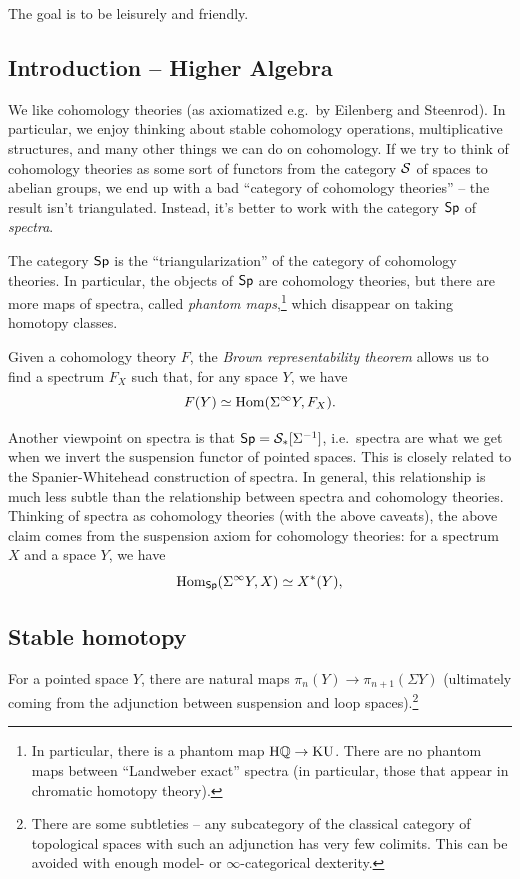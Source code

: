 \documentclass{article}
\begin{document}
The goal is to be leisurely and friendly.

\subsection{Introduction -- Higher Algebra}

We like cohomology theories (as axiomatized e.g.\ by Eilenberg and Steenrod).
In particular, we enjoy thinking about stable cohomology operations, multiplicative structures, and many other things we can do on cohomology.
If we try to think of cohomology theories as some sort of functors from the category $\mathcal{S}$ of spaces to abelian groups, we end up with a bad ``category of cohomology theories'' -- the result isn't triangulated.
Instead, it's better to work with the category $\mathsf{Sp}$ of \emph{spectra}.

\begin{thm}
	The category $\mathsf{Sp}$ is the ``triangularization'' of the category of cohomology theories.
	In particular, the objects of $\mathsf{Sp}$ are cohomology theories, but there are more maps of spectra, called \emph{phantom maps},\footnote{In particular, there is a phantom map $\mathrm{H}\mathbb{Q} \to \mathrm{KU}$.
	There are no phantom maps between ``Landweber exact'' spectra (in particular, those that appear in chromatic homotopy theory).} which disappear on taking homotopy classes.
\end{thm}

Given a cohomology theory $F$, the \emph{Brown representability theorem} allows us to find a spectrum $F_X$ such that, for any space $Y$, we have
\[
	F(Y) \simeq \operatorname{Hom}(\Sigma^\infty Y, F_X).
\]

Another viewpoint on spectra is that $\mathsf{Sp} = \mathcal{S}_*[\Sigma^{-1}]$, i.e.\ spectra are what we get when we invert the suspension functor of pointed spaces.
This is closely related to the Spanier-Whitehead construction of spectra.
In general, this relationship is much less subtle than the relationship between spectra and cohomology theories.
Thinking of spectra as cohomology theories (with the above caveats), the above claim comes from the suspension axiom for cohomology theories: for a spectrum $X$ and a space $Y$, we have
\[
	\operatorname{Hom}_{\mathsf{Sp}}(\Sigma^\infty Y, X) \simeq X^*(Y),
\]

\subsection{Stable homotopy}

For a pointed space $Y$, there are natural maps $\pi_n(Y) \to \pi_{n+1}(\Sigma Y)$ (ultimately coming from the adjunction between suspension and loop spaces).\footnote{There are some subtleties -- any subcategory of the classical category of topological spaces with such an adjunction has very few colimits.
This can be avoided with enough model- or $\infty$-categorical dexterity.}
\end{document}

